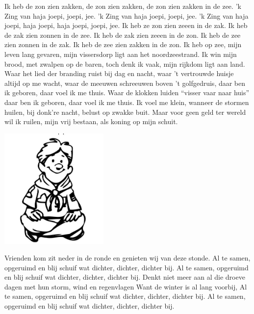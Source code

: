 \documentclass{article}
\begin{document}
\begin{songs}{}
Ik heb de zon zien zakken, de zon zien zakken,
de zon zien zakken in de zee.
\endverse
\beginchorus
'k Zing van haja joepi, joepi, jee.
'k Zing van haja joepi, joepi, jee.
'k Zing van haja joepi, haja joepi,
haja joepi, joepi, jee.
\endchorus
\beginverse
Ik heb ze zon zien zeeen in de zak.
\endverse
\beginverse
Ik heb de zak zien zonnen in de zee.
\endverse
\beginverse
Ik heb de zak zien zeeen in de zon.
\endverse
\beginverse
Ik heb de zee zien zonnen in de zak.
\endverse
\beginverse
Ik heb de zee zien zakken in de zon.
\endverse
\endsong
{}
\beginverse*
Ik heb op zee, mijn leven lang gevaren,
mijn vissersdorp ligt aan het noordzeestrand.
Ik win mijn brood, met zwalpen op de baren,
toch denk ik vaak, mijn rijkdom ligt aan land.
\endverse
\beginchorus
Waar het lied der branding ruist bij dag en nacht,
waar 't vertrouwde huisje altijd op me wacht,
waar de meeuwen schreeuwen boven 't golfgedruis,
daar ben ik geboren, daar voel ik me thuis.
Waar de klokken luiden “visser vaar naar huis”
daar ben ik geboren, daar voel ik me thuis.
\endchorus
\beginverse*
Ik voel me klein, wanneer de stormen huilen,
bij donk’re nacht, belust op zwakke buit.
Maar voor geen geld ter wereld wil ik ruilen,
mijn vrij bestaan, als koning op mijn schuit.
\endverse
\endsong
\begin{intersong}
    \includegraphics[width=0.4\textwidth]{inderonde}
\end{intersong}
\beginverse*
Vrienden kom zit neder in de ronde
en genieten wij van deze stonde.
Al te samen, opgeruimd en blij
schuif wat dichter, dichter, dichter bij.
Al te samen, opgeruimd en blij
schuif wat dichter, dichter, dichter bij.
\endverse
\beginverse*
Denkt niet meer aan al die droeve dagen
met hun storm, wind en regenvlagen
Want de winter is al lang voorbij,
Al te samen, opgeruimd en blij
schuif wat dichter, dichter, dichter bij.
Al te samen, opgeruimd en blij
schuif wat dichter, dichter, dichter bij.
\endverse

\end{songs}
\end{document}
